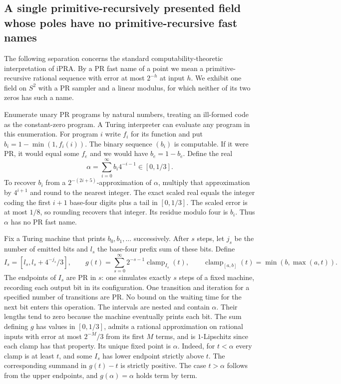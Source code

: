 \subsection{A single primitive-recursively presented field whose poles have no primitive-recursive fast names}
\label{sec:no-pr-pole}

The following separation concerns the standard computability-theoretic
interpretation of iPRA. By a PR fast name of a point we mean a
primitive-recursive rational sequence with error at most $2^{-h}$ at
input $h$. We exhibit one field on $S^2$ with a PR sampler and a linear
modulus, for which neither of its two zeros has such a name.

Enumerate unary PR programs by natural numbers, treating an ill-formed
code as the constant-zero program. A Turing interpreter can evaluate any
program in this enumeration. For program $i$ write $f_i$ for its
function and put $b_i=1-\min(1,f_i(i))$. The binary sequence $(b_i)$
is computable. If it were PR, it would equal some $f_e$ and we would
have $b_e=1-b_e$. Define the real
\[
                     \alpha=\sum_{i=0}^{\infty}b_i4^{-i-1}
                                \in[0,1/3].
\]
To recover $b_i$ from a $2^{-(2i+5)}$-approximation of $\alpha$,
multiply that approximation by $4^{i+1}$ and round to the nearest
integer. The exact scaled real equals the integer coding the first
$i+1$ base-four digits plus a tail in $[0,1/3]$. The scaled error is
at most $1/8$, so rounding recovers that integer. Its residue modulo
four is $b_i$. Thus $\alpha$ has no PR fast name.

Fix a Turing machine that prints $b_0,b_1,\ldots$ successively.
After $s$ steps, let $j_s$ be the number of emitted bits and $l_s$
the base-four prefix sum of these bits. Define
\[
 I_s=[l_s,l_s+4^{-j_s}/3],\qquad
 g(t)=\sum_{s=0}^\infty 2^{-s-1}\operatorname{clamp}_{I_s}(t),
 \qquad \operatorname{clamp}_{[a,b]}(t)=\min(b,\max(a,t)).
\]
The endpoints of $I_s$ are PR in $s$: one simulates exactly $s$ steps
of a fixed machine, recording each output bit in its configuration.
One transition and iteration for a specified number of transitions are
PR. No bound on the waiting time for the next bit enters this operation.
The intervals are nested and contain $\alpha$. Their lengths tend to
zero because the machine eventually prints each bit. The sum defining
$g$ has values in $[0,1/3]$, admits a rational approximation on rational
inputs with error at most $2^{-M}/3$ from its first $M$ terms, and is
$1$-Lipschitz since each clamp has that property. Its unique fixed
point is $\alpha$. Indeed, for $t<\alpha$ every clamp is at least $t$,
and some $I_s$ has lower endpoint strictly above $t$. The corresponding
summand in $g(t)-t$ is strictly positive. The case $t>\alpha$ follows
from the upper endpoints, and $g(\alpha)=\alpha$ holds term by term.

